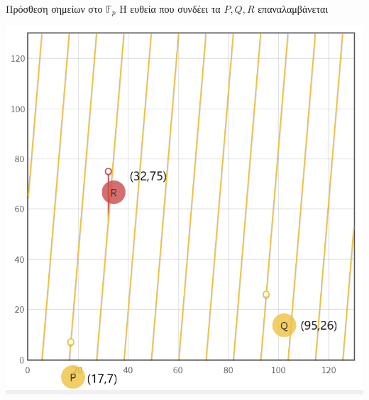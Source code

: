 \documentclass[handout]{beamer}
\begin{document}
\begin{frame}{Πρόσθεση σημείων στο $\mathbb{F}_p$}
Η ευθεία που συνδέει τα $P,Q,R$ επαναλαμβάνεται
\begin{center}
\includegraphics[scale=0.25]{addFp}
\end{center}
\end{frame}
\end{document}
